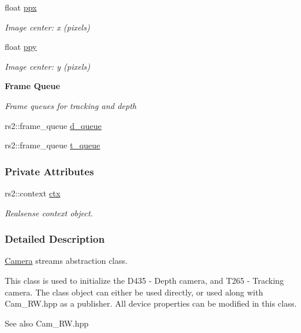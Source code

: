 {\bf }\par
\begin{DoxyCompactItemize}
\item 
float \hyperlink{classCamera_aa646a2de04e9ad37395dcf3c4a171abe}{ppx}
\begin{DoxyCompactList}\small\item\em Image center\+: x (pixels) \end{DoxyCompactList}\item 
float \hyperlink{classCamera_a0e51f157264b9c9e18feb584c5a6c606}{ppy}
\begin{DoxyCompactList}\small\item\em Image center\+: y (pixels) \end{DoxyCompactList}\end{DoxyCompactItemize}

\begin{Indent}{\bf Frame Queue}\par
{\em Frame queues for tracking and depth }\begin{DoxyCompactItemize}
\item 
rs2\+::frame\+\_\+queue \hyperlink{classCamera_a84a3a043e61b967fb1dc6fbe62bf33aa}{d\+\_\+queue}
\item 
rs2\+::frame\+\_\+queue \hyperlink{classCamera_ad8a4c52c0ae125ab8ca66902408f5e95}{t\+\_\+queue}
\end{DoxyCompactItemize}
\end{Indent}
\subsubsection*{Private Attributes}
\begin{DoxyCompactItemize}
\item 
rs2\+::context \hyperlink{classCamera_a4373bc8793e3bb1d6eb2cca3eb25a31e}{ctx}
\begin{DoxyCompactList}\small\item\em Realsense context object. \end{DoxyCompactList}\end{DoxyCompactItemize}


\subsubsection{Detailed Description}
\hyperlink{classCamera}{Camera} streams abstraction class. 

This class is used to initialize the D435 -\/ Depth camera, and T265 -\/ Tracking camera. The class object can either be used directly, or used along with Cam\+\_\+\+R\+W.\+hpp as a publisher. All device properties can be modified in this class. \begin{DoxySeeAlso}{See also}
Cam\+\_\+\+R\+W.\+hpp 
\end{DoxySeeAlso}


